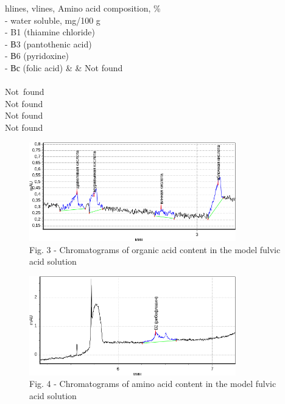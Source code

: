\begin{table}[H]
\begin{tblr}{
  hlines,
  vlines,
}
{Amino acid composition, \%\\- water soluble, mg/100 g\\- B1 (thiamine chloride)\\- В3 (pantothenic acid)\\- В6 (pyridoxine)\\- Вс (folic acid)}                 &                                               & {Not found\\\\Not~found\\Not found\\Not found\\Not found} 
\end{tblr}
\end{table}

\begin{figure}[H]
	\centering
	\includegraphics[width=0.8\textwidth]{media/chem/image6}
	\caption*{Fig. 3 - Chromatograms of organic acid content in the model fulvic acid solution}
\end{figure}

\begin{figure}[H]
	\centering
	\includegraphics[width=0.8\textwidth]{media/chem/image7}
	\caption*{Fig. 4 - Chromatograms of amino acid content in the model fulvic acid solution}
\end{figure}

